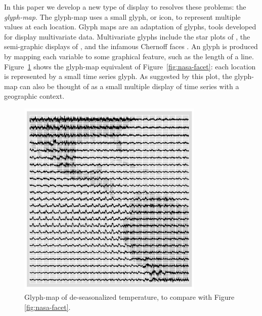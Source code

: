 \documentclass[oneside]{article}
\begin{document}

In this paper we develop a new type of display to resolves these problems: the \emph{glyph-map}. The glyph-map uses a small glyph, or icon, to represent multiple values at each location. Glyph maps are an adaptation of glyphs, tools developed for display multivariate data. Multivariate glyphs include the star plots of \citet{mayr:1877}, the semi-graphic displays of \citet{anderson:1960}, and the infamous Chernoff faces \citep{chernoff:1973}. An glyph is produced by mapping each variable to some graphical feature, such as the length of a line. Figure~\ref{fig:nasa-glyph} shows the glyph-map equivalent of Figure~\ref{fig:nasa-facet}: each location is represented by a small time series glyph. As suggested by this plot, the glyph-map can also be thought of as a small multiple display \citet{tufte:2001} of time series with a geographic context.


\begin{figure}[htbp]
  \centering
  \includegraphics[width=3.5in]{nasa-deseas-glyph}
  \caption{Glyph-map of de-seasonalized temperature, to compare with Figure \ref{fig:nasa-facet}. }
  \label{fig:nasa-glyph}
\end{figure}
\end{document}
